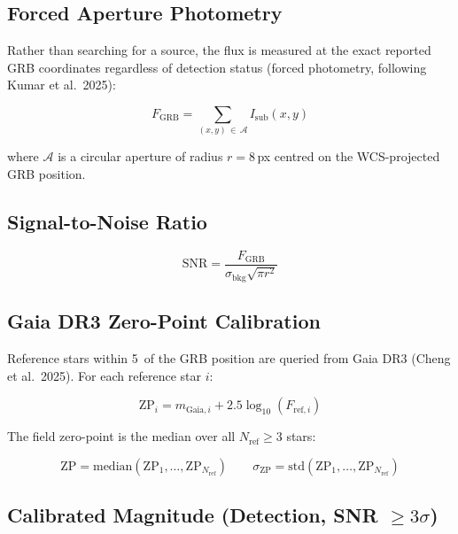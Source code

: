 \documentclass[12pt,a4paper]{article}
\begin{document}
\subsection{Forced Aperture Photometry}

Rather than searching for a source, the flux is measured at the exact
reported GRB coordinates regardless of detection status (forced photometry,
following Kumar et al.\ 2025):

\begin{equation}
    F_\mathrm{GRB} = \sum_{(x,y)\,\in\,\mathcal{A}} I_\mathrm{sub}(x,y)
\end{equation}

where $\mathcal{A}$ is a circular aperture of radius $r = 8$\,px centred
on the WCS-projected GRB position.

\subsection{Signal-to-Noise Ratio}

\begin{equation}
    \mathrm{SNR} = \frac{F_\mathrm{GRB}}{\sigma_\mathrm{bkg}
    \sqrt{\pi r^2}}
\end{equation}

\subsection{Gaia DR3 Zero-Point Calibration}

Reference stars within 5\arcmin\ of the GRB position are queried from
Gaia DR3 (Cheng et al.\ 2025). For each reference star $i$:

\begin{equation}
    \mathrm{ZP}_i = m_{\mathrm{Gaia},i} + 2.5 \log_{10}(F_{\mathrm{ref},i})
\end{equation}

The field zero-point is the median over all $N_\mathrm{ref} \geq 3$ stars:

\begin{equation}
    \mathrm{ZP} = \mathrm{median}(\mathrm{ZP}_1, \ldots, \mathrm{ZP}_{N_\mathrm{ref}})
    \qquad \sigma_\mathrm{ZP} = \mathrm{std}(\mathrm{ZP}_1, \ldots,
    \mathrm{ZP}_{N_\mathrm{ref}})
\end{equation}

\subsection{Calibrated Magnitude (Detection, SNR $\geq 3\sigma$)}
\end{document}
